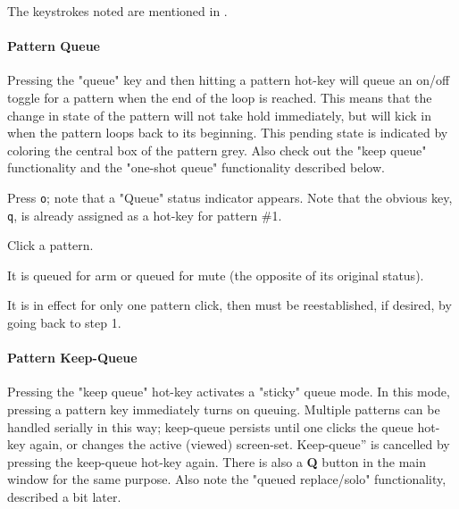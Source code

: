    The keystrokes noted are mentioned in
   .

\paragraph{Pattern Queue}
\label{paragraph:patterns_pattern_queue}

   Pressing the "queue" key and then hitting a pattern hot-key
   will queue an on/off toggle for a pattern when the end of the loop is
   reached.
   This means that the change in state of the pattern will not take hold
   immediately, but will kick in when the pattern loops back to its beginning.
   This pending state is indicated by coloring the central box of the
   pattern grey.
   Also check out the "keep queue" functionality and
   the "one-shot queue" functionality described below.

   \begin{enumber}
      \item Press \texttt{o}; note that a "Queue" status indicator appears.
         Note that the obvious key, \texttt{q}, is already assigned as
         a hot-key for pattern \#1.
      \item Click a pattern.
      \item It is queued for arm or queued for mute (the opposite of its
         original status).
      \item It is in effect for only one pattern click, then must be
         reestablished, if desired, by going back to step 1.
   \end{enumber}

%

\paragraph{Pattern Keep-Queue}
\label{paragraph:patterns_pattern_keep_queue}

   Pressing the "keep queue" hot-key activates a "sticky" queue mode.
   In this mode, pressing a pattern key immediately turns on queuing.
   Multiple patterns can be handled serially in this way;
   keep-queue persists until one clicks the queue hot-key again,
   or changes the active (viewed) screen-set. 
   Keep-queue” is cancelled by pressing the keep-queue hot-key again.
   There is also a \textbf{Q} button in the main window
   for the same purpose.
   Also note the "queued replace/solo" functionality, described a bit later.

